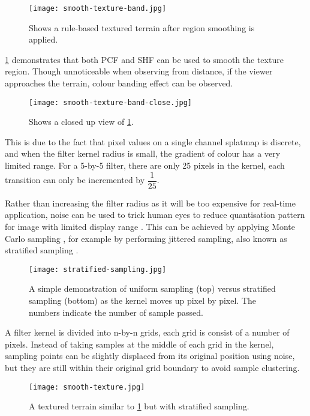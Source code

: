 \documentclass[oneside, a4paper]{report}
\begin{document}
    \begin{figure}[H]
        \texttt{[image: smooth-texture-band.jpg]}
        \caption{Shows a rule-based textured terrain after region smoothing is applied.}
        \label{smooth_texture_band}
    \end{figure}

    \ref{smooth_texture_band} demonstrates that both PCF and SHF can be used to smooth the texture region. Though unnoticeable when observing from distance, if the viewer approaches the terrain, colour banding effect can be observed.

    \begin{figure}[H]
        \center
        \texttt{[image: smooth-texture-band-close.jpg]}
        \caption{Shows a closed up view of \ref{smooth_texture_band}.}
    \end{figure}

    This is due to the fact that pixel values on a single channel splatmap is discrete, and when the filter kernel radius is small, the gradient of colour has a very limited range. For a 5-by-5 filter, there are only 25 pixels in the kernel, each transition can only be incremented by \(\dfrac{1}{25}\).

    Rather than increasing the filter radius as it will be too expensive for real-time application, noise can be used to trick human eyes to reduce quantisation pattern for image with limited display range \cite{dithering}. This can be achieved by applying Monte Carlo sampling \cite{pcf}, for example by performing jittered sampling, also known as stratified sampling \cite{gems2_stratified_sampling}.

    \begin{figure}[H]
        \center
        \texttt{[image: stratified-sampling.jpg]}
        \caption{A simple demonstration of uniform sampling (top) versus stratified sampling (bottom) as the kernel moves up pixel by pixel. The numbers indicate the number of sample passed.}
    \end{figure}

    A filter kernel is divided into n-by-n grids, each grid is consist of a number of pixels. Instead of taking samples at the middle of each grid in the kernel, sampling points can be slightly displaced from its original position using noise, but they are still within their original grid boundary to avoid sample clustering.

    \begin{figure}[H]
        \texttt{[image: smooth-texture.jpg]}
        \caption{A textured terrain similar to \ref{smooth_texture_band} but with stratified sampling.}
    \end{figure}
\end{document}

